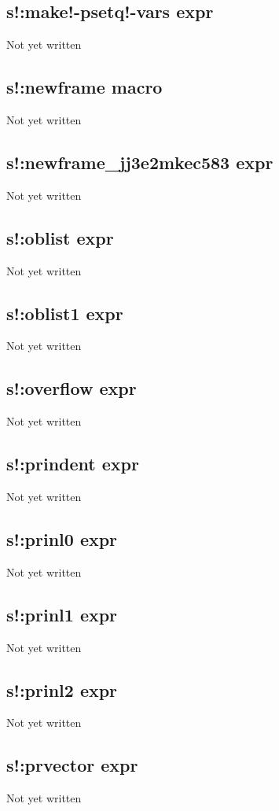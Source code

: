 \documentclass[a4paper,11pt]{article}
\begin{document}
\subsection{\ttfamily s!:make!-psetq!-vars expr}
Not yet written

\subsection{\ttfamily s!:newframe macro}
Not yet written

\subsection{\ttfamily s!:newframe\_jj3e2mkec583 expr}
Not yet written

\subsection{\ttfamily s!:oblist expr}
Not yet written

\subsection{\ttfamily s!:oblist1 expr}
Not yet written

\subsection{\ttfamily s!:overflow expr}
Not yet written

\subsection{\ttfamily s!:prindent expr}
Not yet written

\subsection{\ttfamily s!:prinl0 expr}
Not yet written

\subsection{\ttfamily s!:prinl1 expr}
Not yet written

\subsection{\ttfamily s!:prinl2 expr}
Not yet written

\subsection{\ttfamily s!:prvector expr}
Not yet written
\end{document}
